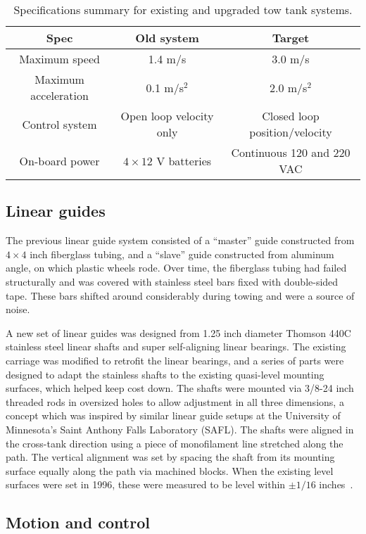 \begin{table}
\centering
\begin{tabular}{c|c|c}
Spec & Old system & Target \\ 
\hline
Maximum speed & 1.4 m/s  & 3.0 m/s \\ 
Maximum acceleration & 0.1 m/s$^2$ & 2.0 m/s$^2$ \\ 
Control system & Open loop velocity only & Closed loop position/velocity \\ 
On-board power & $4\times12$ V batteries & Continuous 120 and 220 VAC \\ 
\end{tabular}
\caption{Specifications summary for existing and upgraded tow tank systems.} 
\label{tab:tow-tank-specs}
\end{table}


\subsection{Linear guides}

The previous linear guide system consisted of a ``master'' guide constructed
from $4 \times 4$ inch fiberglass tubing, and a ``slave'' guide constructed from
aluminum angle, on which plastic wheels rode. Over time, the fiberglass tubing
had failed structurally and was covered with stainless steel bars fixed with
double-sided tape. These bars shifted around considerably during towing and were
a source of noise.

A new set of linear guides was designed from 1.25 inch diameter Thomson 440C
stainless steel linear shafts and super self-aligning linear bearings. The
existing carriage was modified to retrofit the linear bearings, and a series of
parts were designed to adapt the stainless shafts to the existing quasi-level
mounting surfaces, which helped keep cost down. The shafts were mounted via
3/8-24 inch threaded rods in oversized holes to allow adjustment in all three
dimensions, a concept which was inspired by similar linear guide setups at the
University of Minnesota's Saint Anthony Falls Laboratory (SAFL). The shafts were
aligned in the cross-tank direction using a piece of monofilament line stretched
along the path. The vertical alignment was set by spacing the shaft from its
mounting surface equally along the path via machined blocks. When the existing
level surfaces were set in 1996, these were measured to be level within $\pm
1/16$ inches~\cite{Darnell1996}.


\subsection{Motion and control}

